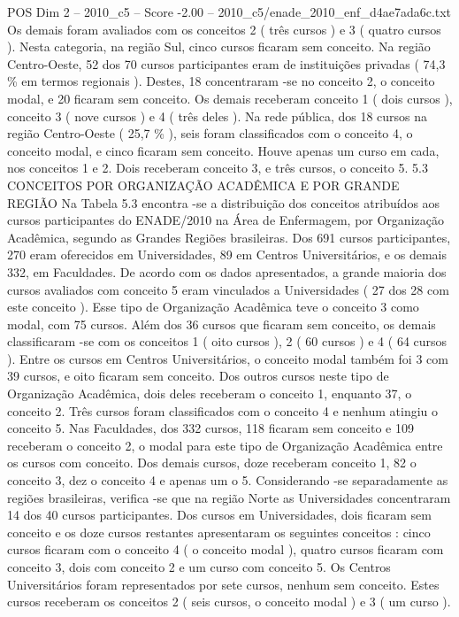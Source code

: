 \begin{textsample}{POS Dim 2 – 2010\_c5 – Score -2.00 – 2010\_c5/enade\_2010\_enf\_d4ae7ada6c.txt}
Os demais foram avaliados com os conceitos 2 ( três cursos ) e 3 ( quatro cursos ).
Nesta categoria, na região Sul, cinco cursos ficaram sem conceito.
Na região Centro-Oeste, 52 dos 70 cursos participantes eram de instituições privadas ( 74,3 \% em termos regionais ).
Destes, 18 concentraram -se no conceito 2, o conceito modal, e 20 ficaram sem conceito.
Os demais receberam conceito 1 ( dois cursos ), conceito 3 ( nove cursos ) e 4 ( três deles ).
Na rede pública, dos 18 cursos na região Centro-Oeste ( 25,7 \% ), seis foram classificados com o conceito 4, o conceito modal, e cinco ficaram sem conceito.
Houve apenas um curso em cada, nos conceitos 1 e 2.
Dois receberam conceito 3, e três cursos, o conceito 5. 5.3 CONCEITOS POR ORGANIZAÇÃO ACADÊMICA E POR GRANDE REGIÃO Na Tabela 5.3 encontra -se a distribuição dos conceitos atribuídos aos cursos participantes do ENADE/2010 na Área de Enfermagem, por Organização Acadêmica, segundo as Grandes Regiões brasileiras.
Dos 691 cursos participantes, 270 eram oferecidos em Universidades, 89 em Centros Universitários, e os demais 332, em Faculdades.
De acordo com os dados apresentados, a grande maioria dos cursos avaliados com conceito 5 eram vinculados a Universidades ( 27 dos 28 com este conceito ).
Esse tipo de Organização Acadêmica teve o conceito 3 como modal, com 75 cursos.
Além dos 36 cursos que ficaram sem conceito, os demais classificaram -se com os conceitos 1 ( oito cursos ), 2 ( 60 cursos ) e 4 ( 64 cursos ).
Entre os cursos em Centros Universitários, o conceito modal também foi 3 com 39 cursos, e oito ficaram sem conceito.
Dos outros cursos neste tipo de Organização Acadêmica, dois deles receberam o conceito 1, enquanto 37, o conceito 2.
Três cursos foram classificados com o conceito 4 e nenhum atingiu o conceito 5.
Nas Faculdades, dos 332 cursos, 118 ficaram sem conceito e 109 receberam o conceito 2, o modal para este tipo de Organização Acadêmica entre os cursos com conceito.
Dos demais cursos, doze receberam conceito 1, 82 o conceito 3, dez o conceito 4 e apenas um o 5.
Considerando -se separadamente as regiões brasileiras, verifica -se que na região Norte as Universidades concentraram 14 dos 40 cursos participantes.
Dos cursos em Universidades, dois ficaram sem conceito e os doze cursos restantes apresentaram os seguintes conceitos : cinco cursos ficaram com o conceito 4 ( o conceito modal ), quatro cursos ficaram com conceito 3, dois com conceito 2 e um curso com conceito 5.
Os Centros Universitários foram representados por sete cursos, nenhum sem conceito.
Estes cursos receberam os conceitos 2 ( seis cursos, o conceito modal ) e 3 ( um curso ).

\end{textsample}
